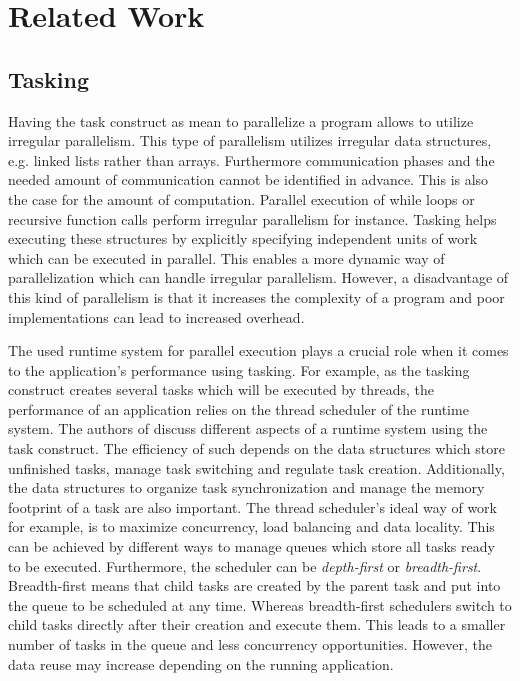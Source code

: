 \section{Related Work}
\label{sec:RelWork}

\subsection{Tasking}
\label{subsec:Tasking}
  Having the task construct as mean to parallelize a program allows to utilize irregular parallelism.
  This type of parallelism utilizes irregular data structures, e.g. linked lists rather than arrays.
  Furthermore communication phases and the needed amount of communication cannot be identified in advance.
  This is also the case for the amount of computation.\cite{Chakrabarti.1993}
  Parallel execution of while loops or recursive function calls perform irregular parallelism for instance.
  Tasking helps executing these structures by explicitly specifying independent units of work which can be executed in parallel.
  This enables a more dynamic way of parallelization which can handle irregular parallelism.
  However, a disadvantage of this kind of parallelism is that it increases the complexity of a program and poor implementations can lead to increased overhead.~\cite{Ayguade.2009}~\cite{LaGrone.2011} 
  
  The used runtime system for parallel execution plays a crucial role when it comes to the application's performance using tasking. 
  For example, as the tasking construct creates several tasks which will be executed by threads, the performance of an application relies on the thread scheduler of the runtime system.
  The authors of \cite{LaGrone.2011} discuss different aspects of a runtime system using the task construct.
  The efficiency of such depends on the data structures which store unfinished tasks, manage task switching and regulate task creation.
  Additionally, the data structures to organize task synchronization and manage the memory footprint of a task are also important.
  The thread scheduler's ideal way of work for example, is to maximize concurrency, load balancing and data locality.
  This can be achieved by different ways to manage queues which store all tasks ready to be executed.
  Furthermore, the scheduler can be \textit{depth-first} or \textit{breadth-first}.
  Breadth-first means that child tasks are created by the parent task and put into the queue to be scheduled at any time.
  Whereas breadth-first schedulers switch to child tasks directly after their creation and execute them.
  This leads to a smaller number of tasks in the queue and less concurrency opportunities.
  However, the data reuse may increase depending on the running application.
 
